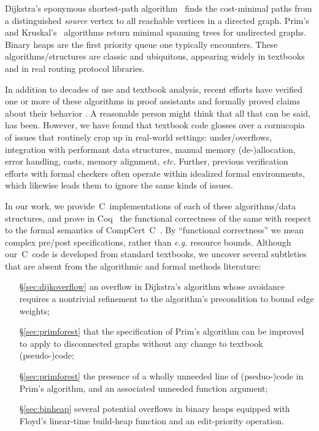 Dijkstra's eponymous shortest-path algorithm~\cite{DBLP:journals/nm/Dijkstra59} finds
the cost-minimal paths from a distinguished \emph{source} vertex
to all reachable vertices in a directed graph. Prim's~\cite{prim2:prim} and Kruskal's~\cite{kruskal} algorithms return minimal spanning trees for undirected graphs.  Binary heaps are the first priority queue one typically encounters.
These algorithms/structures are classic and ubiquitous, appearing widely in textbooks~\cite{clrs,DBLP:books/daglib/0022194,heineman2008algorithms,rozen,kepnergilbert,sedgewick} and in real routing protocol libraries.

In addition to decades of use and textbook analysis, recent efforts have verified one or more of these algorithms in proof
assistants and formally proved claims about their behavior \cite{chen2003dijkstra,Moore2005,arthur,DBLP:journals/afp/LammichN19,DBLP:conf/ictac/Guttmann16}.  A reasonable person might think that all
that can be said, has been.  However, we have found that
textbook code glosses over a cornucopia
of issues that routinely crop up in real-world settings: under/overflows, integration with performant data structures, manual memory (de-)allocation,
error handling, casts, memory alignment, \emph{etc.} Further, previous verification efforts with formal checkers often operate
within idealized formal environments, which likewise leads them to ignore the same kinds of issues.

In our work, we provide~C~implementations of each of these algorithms/data structures, and prove in Coq~\cite{Coq} the functional correctness of the same with respect to the formal semantics of CompCert~C~\cite{leroy:compcert}.  By ``functional correctness'' we mean complex pre/post specifications, rather than \emph{e.g.} resource bounds.  Although our~C~code is developed from standard textbooks, we uncover several subtleties
that are absent from the algorithmic and formal methods literature:

\begin{itemize}
\item[\S\ref{sec:dijkoverflow}] an overflow in Dijkstra's algorithm whose avoidance requires a nontrivial refinement to the algorithm's precondition to bound edge weights;
\item[\S\ref{sec:primforest}] that the specification of Prim's algorithm can be improved to apply to disconnected graphs without any change to textbook (pseudo-)code;
\item[\S\ref{sec:primforest}] the presence of a wholly unneeded line of (pseduo-)code in Prim's algorithm, and an associated unneeded function argument;
\item[\S\ref{sec:binheap}] several potential overflows in binary heaps equipped with Floyd's linear-time build-heap function and an edit-priority operation.
\end{itemize}

